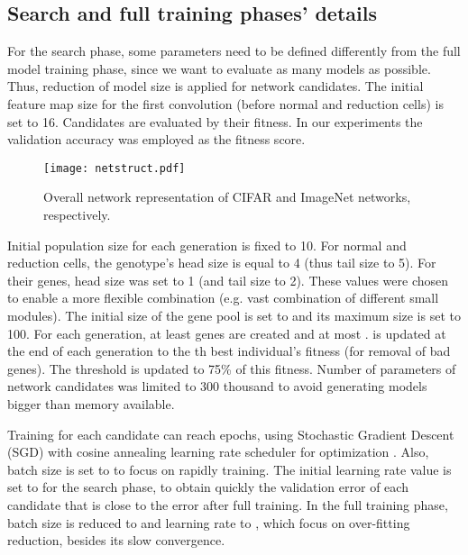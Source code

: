 \documentclass[conference]{IEEEtran}
\begin{document}
	\subsection{Search and full training phases' details}
	
	For the search phase, some parameters need to be defined differently from the full model training phase, since we want to evaluate as many models as possible.
	Thus, reduction of model size is applied for network candidates.
	The initial feature map size for the first convolution (before normal and reduction cells) is set to 16.
	Candidates are evaluated by their fitness.
	In our experiments the validation accuracy was employed as the fitness score.
	
	\begin{figure*}[hbt]
		\centering
		\texttt{[image: netstruct.pdf]}
		\caption{Overall network representation of CIFAR and ImageNet networks, respectively.}
		\label{fig:cifar_and_imagenet}
	\end{figure*}
	
	Initial population size  for each generation is fixed to 10.
	For normal and reduction cells, the genotype's head size is equal to 4 (thus tail size to 5). 
	For their genes, head size was set to 1 (and tail size to 2).
	These values were chosen to enable a more flexible combination (e.g. vast combination of different small modules).
	The initial size of the gene pool is set to  and its maximum size  is set to 100. For each generation, at least  genes are created and at most .
	 is updated at the end of each generation to the th best individual's fitness (for removal of bad genes).
	The threshold  is updated to 75\% of this fitness.
	Number of parameters of network candidates was limited to 300 thousand to avoid generating models bigger than memory available.
	
	Training for each candidate can reach  epochs, using Stochastic Gradient Descent (SGD) with cosine annealing learning rate scheduler for optimization \cite{loshchilov2016sgdr}.
	Also, batch size is set to  to focus on rapidly training.
	The initial learning rate value is set to  for the search phase, to obtain quickly the validation error of each candidate that is close to the error after full training.
	In the full training phase, batch size is reduced to  and learning rate to , which focus on over-fitting reduction, besides its slow convergence.
	
\end{document}
